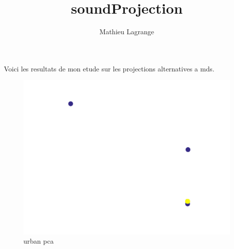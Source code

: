 \documentclass[12pt,a4paper,fleqn]{tufte-handout}
\title{soundProjection}
\author{ Mathieu Lagrange }
\begin{document}
 
  
\maketitle 

Voici les resultats de mon etude sur les projections alternatives a mds.


  
  \begin{figure}
  \begin{center}
  \includegraphics[scale=.5]{figures/urban_pca}
  \caption{urban pca}
  \end{center}
  \end{figure}
\end{document}
